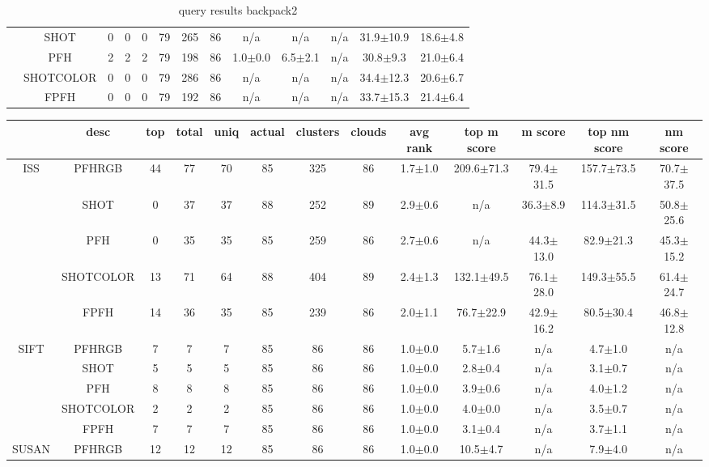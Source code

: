 \documentclass[11pt,a4paper]{kth-mag}
\begin{document}
\begin{landscape}
\begin{table}
\begin{tabular}{cc|ccccccccccc}
      &SHOT & 0 & 0 & 0 & 79 & 265 & 86 & n/a & n/a & n/a & 31.9$\pm$10.9 & 18.6$\pm$4.8\\
      &PFH & 2 & 2 & 2 & 79 & 198 & 86 & 1.0$\pm$0.0 & 6.5$\pm$2.1 & n/a & 30.8$\pm$9.3 & 21.0$\pm$6.4\\
      &SHOTCOLOR & 0 & 0 & 0 & 79 & 286 & 86 & n/a & n/a & n/a & 34.4$\pm$12.3 & 20.6$\pm$6.7\\
      &FPFH & 0 & 0 & 0 & 79 & 192 & 86 & n/a & n/a & n/a & 33.7$\pm$15.3 & 21.4$\pm$6.4\\
    \end{tabular}
    \caption{query results backpack2}
    \label{tab:qbackpack2}
  \end{table}
  \begin{table}
    \begin{tabular}{cc|ccccccccccc}
      & desc & top & total & uniq & actual & clusters & clouds & avg rank & top m score & m score & top nm score & nm score\\\hline
      \multirow{5}{*}{ISS} & PFHRGB & 44 & 77 & 70 & 85 & 325 & 86 & 1.7$\pm$1.0 & 209.6$\pm$71.3 & 79.4$\pm$31.5 & 157.7$\pm$73.5 & 70.7$\pm$37.5\\
      &SHOT & 0 & 37 & 37 & 88 & 252 & 89 & 2.9$\pm$0.6 & n/a & 36.3$\pm$8.9 & 114.3$\pm$31.5 & 50.8$\pm$25.6\\
      &PFH & 0 & 35 & 35 & 85 & 259 & 86 & 2.7$\pm$0.6 & n/a & 44.3$\pm$13.0 & 82.9$\pm$21.3 & 45.3$\pm$15.2\\
      &SHOTCOLOR & 13 & 71 & 64 & 88 & 404 & 89 & 2.4$\pm$1.3 & 132.1$\pm$49.5 & 76.1$\pm$28.0 & 149.3$\pm$55.5 & 61.4$\pm$24.7\\
      &FPFH & 14 & 36 & 35 & 85 & 239 & 86 & 2.0$\pm$1.1 & 76.7$\pm$22.9 & 42.9$\pm$16.2 & 80.5$\pm$30.4 & 46.8$\pm$12.8\\
      \hline\multirow{5}{*}{SIFT} & PFHRGB & 7 & 7 & 7 & 85 & 86 & 86 & 1.0$\pm$0.0 & 5.7$\pm$1.6 & n/a & 4.7$\pm$1.0 & n/a\\
      &SHOT & 5 & 5 & 5 & 85 & 86 & 86 & 1.0$\pm$0.0 & 2.8$\pm$0.4 & n/a & 3.1$\pm$0.7 & n/a\\
      &PFH & 8 & 8 & 8 & 85 & 86 & 86 & 1.0$\pm$0.0 & 3.9$\pm$0.6 & n/a & 4.0$\pm$1.2 & n/a\\
      &SHOTCOLOR & 2 & 2 & 2 & 85 & 86 & 86 & 1.0$\pm$0.0 & 4.0$\pm$0.0 & n/a & 3.5$\pm$0.7 & n/a\\
      &FPFH & 7 & 7 & 7 & 85 & 86 & 86 & 1.0$\pm$0.0 & 3.1$\pm$0.4 & n/a & 3.7$\pm$1.1 & n/a\\
      \hline\multirow{5}{*}{SUSAN} & PFHRGB & 12 & 12 & 12 & 85 & 86 & 86 & 1.0$\pm$0.0 & 10.5$\pm$4.7 & n/a & 7.9$\pm$4.0 & n/a\\

\end{tabular}
\end{table}
\end{landscape}
\end{document}

